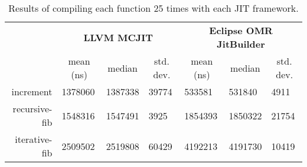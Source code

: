 \begin{table*}[t]
  \begin{tabular}{|r|l|l|l|l|l|l|}
  \hline
  \multicolumn{1}{|l|}{\multirow{2}{*}{}} & \multicolumn{3}{c|}{\textbf{LLVM MCJIT}}                                                                                                       & \multicolumn{3}{c|}{\textbf{Eclipse OMR JitBuilder}}                                                                              \\ \cline{2-7}
  \multicolumn{1}{|c|}{\textbf{Program}}  & \multicolumn{1}{c|}{mean (ns)}  & \multicolumn{1}{c|}{median}  & \multicolumn{1}{c|}{std. dev.}     & \multicolumn{1}{c|}{mean (ns)}           & \multicolumn{1}{c|}{median} & \multicolumn{1}{c|}{std. dev.}             \\ \hline
  increment                               & \num{1378060}                            & \num{1387338}                & \num{39774}               & \num{533581}                             & \num{531840}                & \num{4911}                                 \\ \hline
  recursive-fib                           & \num{1548316}                            & \num{1547491}                & \num{3925}                & \num{1854393}                            & \num{1850322}               & \num{21754}                                \\ \hline
  iterative-fib                           & \num{2509502}                            & \num{2519808}                & \num{60429}               & \num{4192213}                            & \num{4191730}               & \num{10419}                                \\ \hline
  \end{tabular}
  \caption{Results of compiling each function 25 times with each JIT framework.}
  \label{tab:compile_time}
\end{table*}

